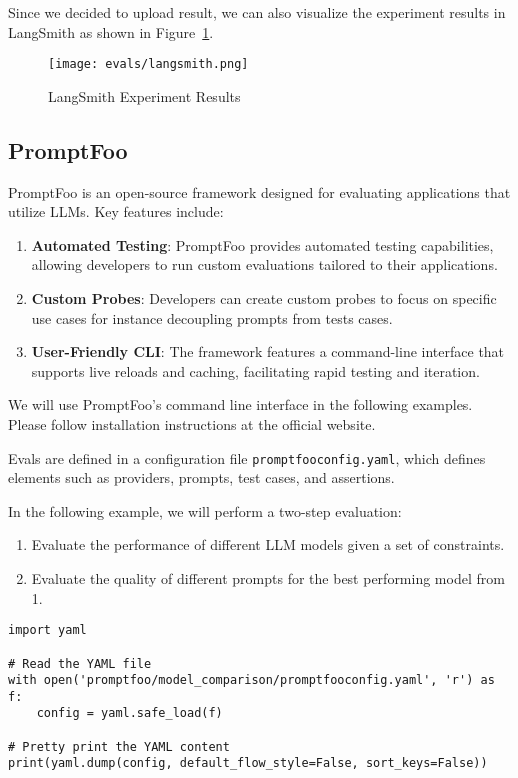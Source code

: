 Since we decided to upload result, we can also visualize the experiment results in LangSmith as shown in Figure~\ref{fig:langsmith}.

\begin{figure}[h]
\centering
\texttt{[image: evals/langsmith.png]}
\label{fig:langsmith}
\caption{LangSmith Experiment Results}
\end{figure}
\subsection{PromptFoo}

PromptFoo  is an open-source framework designed for evaluating applications that utilize LLMs. Key features include:

\begin{enumerate}
    \item \textbf{Automated Testing}: PromptFoo provides automated testing capabilities, allowing developers to run custom evaluations tailored to their applications.

    \item \textbf{Custom Probes}: Developers can create custom probes to focus on specific use cases for instance decoupling prompts from tests cases.

    \item \textbf{User-Friendly CLI}: The framework features a command-line interface that supports live reloads and caching, facilitating rapid testing and iteration.
\end{enumerate}

We will use PromptFoo's command line interface in the following examples. Please follow installation instructions at the official website.

Evals are defined in a configuration file \texttt{promptfooconfig.yaml}, which defines elements such as providers, prompts, test cases, and assertions.

In the following example, we will perform a two-step evaluation:

\begin{enumerate}
    \item Evaluate the performance of different LLM models given a set of constraints.
    \item Evaluate the quality of different prompts for the best performing model from 1.
\end{enumerate}


\begin{verbatim}
import yaml

# Read the YAML file
with open('promptfoo/model_comparison/promptfooconfig.yaml', 'r') as f:
    config = yaml.safe_load(f)

# Pretty print the YAML content 
print(yaml.dump(config, default_flow_style=False, sort_keys=False))
\end{verbatim}

